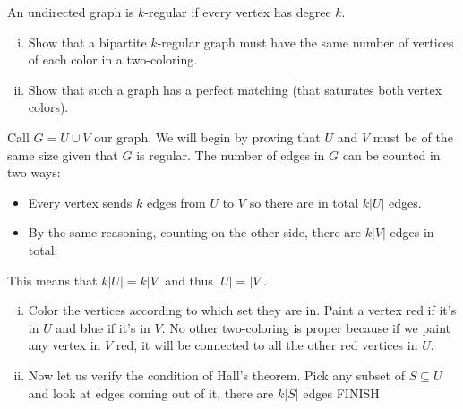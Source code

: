 \documentclass[12pt]{memoir}
\begin{document}
\begin{Ej}[Exercise 9]
   An undirected graph is $k$-regular if every vertex has degree $k$.
   \begin{enumerate}[i)]
    \item Show that a bipartite $k$-regular graph must have the same number of vertices of each color in a two-coloring.
    \item Show that such a graph has a perfect matching (that saturates both vertex colors).
   \end{enumerate} 
\end{Ej}
\begin{ptcbr}
    Call $G=U\cup V$ our graph. We will begin by proving that $U$ and $V$ must be of the same size given that $G$ is regular. The number of edges in $G$ can be counted in two ways:
    \begin{itemize}
        \itemsep=-0.4em
        \item Every vertex sends $k$ edges from $U$ to $V$ so there are in total $k|U|$ edges.
        \item By the same reasoning, counting on the other side, there are $k|V|$ edges in total. 
    \end{itemize}
    This means that $k|U|=k|V|$ and thus $|U|=|V|$.
    \begin{enumerate}[i)]
        \itemsep=-0.4em
        \item Color the vertices according to which set they are in. Paint a vertex red if it's in $U$ and blue if it's in $V$. No other two-coloring is proper because if we paint any vertex in $V$ red, it will be connected to all the other red vertices in $U$. 
        \item Now let us verify the condition of Hall's theorem. Pick any subset of $S\subseteq U$ and look at edges coming out of it, there are $k|S|$ edges FINISH
    \end{enumerate}
\end{ptcbr}
\end{document}
